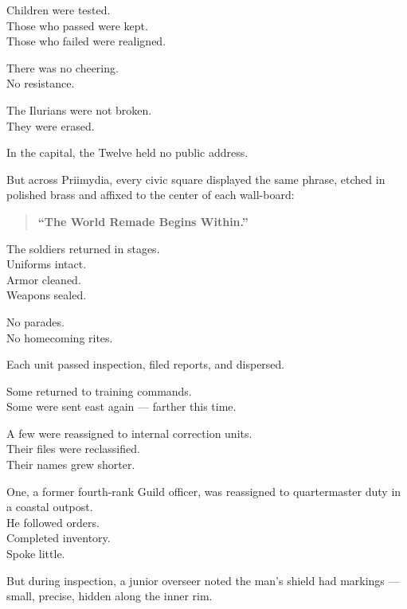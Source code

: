 \documentclass[12pt]{article}
\begin{document}
Children were tested.\\
Those who passed were kept.\\
Those who failed were realigned.

\vspace{1em}

There was no cheering.\\
No resistance.

The Ilurians were not broken.\\
They were erased.

\vspace{1em}

In the capital, the Twelve held no public address.

But across Priimydia, every civic square displayed the same phrase, etched in polished brass and affixed to the center of each wall-board:

\begin{quote}
\textbf{“The World Remade Begins Within.”}
\end{quote}

\vspace{1em}

The soldiers returned in stages.\\
Uniforms intact.\\
Armor cleaned.\\
Weapons sealed.

No parades.\\
No homecoming rites.

Each unit passed inspection, filed reports, and dispersed.

\vspace{1em}

Some returned to training commands.\\
Some were sent east again — farther this time.

A few were reassigned to internal correction units.\\
Their files were reclassified.\\
Their names grew shorter.

\vspace{1em}

One, a former fourth-rank Guild officer, was reassigned to quartermaster duty in a coastal outpost.\\
He followed orders.\\
Completed inventory.\\
Spoke little.

But during inspection, a junior overseer noted the man’s shield had markings — small, precise, hidden along the inner rim.
\end{document}
